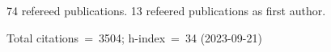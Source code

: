 74 refereed publications. 13 refeered publications as first author.

Total citations~=~3504; h-index~=~34 (2023-09-21)
